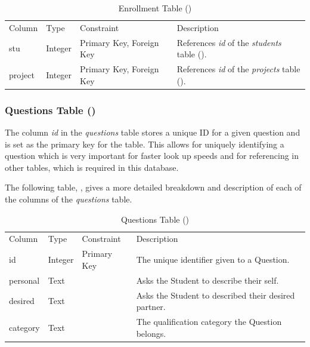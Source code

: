 \documentclass[12pt,letterpaper]{article}
\begin{document}
\begin{table}[H]
	\caption{Enrollment Table ()} 
	\begin{tabu} to \textwidth {l l X X[4]}
		\tableheader{}Column & Type & Constraint & Description \\
		stu     & Integer & Primary Key,\newline
		                    Foreign Key          & References \textit{id} of the \textit{students} table (). \\
		project & Integer & Primary Key,\newline
		                    Foreign Key          & References \textit{id} of the \textit{projects} table (). \\
	\end{tabu}
\end{table}

\subsubsection*{Questions Table ()}
The column \textit{id} in the \textit{questions} table stores a unique ID for a given question and is set as the primary key for the table. This allows for uniquely identifying a question which is very important for faster look up speeds and for referencing in other tables, which is required in this database.

The following table, , gives a more detailed breakdown and description of each of the columns of the \textit{questions} table.

\begin{table}[H]
	\caption{Questions Table ()} 
	\begin{tabu} to \textwidth {l l l X}
		\tableheader{}Column & Type & Constraint & Description \\
		id       & Integer & Primary Key & The unique identifier given to a Question. \\
		personal & Text    &             & Asks the Student to describe their self. \\
		desired  & Text    &             & Asks the Student to described their desired partner. \\
		category & Text    &             & The qualification category the Question belongs. \\
	\end{tabu}
\end{table}
\end{document}
